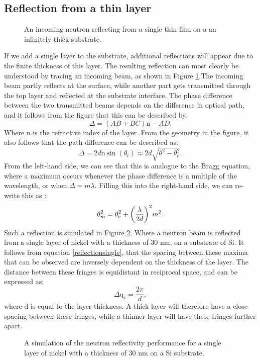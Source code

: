 \subsection{Reflection from a thin layer}
\begin{figure}[b]
	\centering
	\def\svgwidth{\textwidth}
	
	\caption{An incoming neutron reflecting from a single thin film on a an infinitely thick substrate.}
	\label{singlelayersketch}
\end{figure}
If we add a single layer to the substrate, additional reflections will appear due to the finite thickness of this layer. The resulting reflection can most clearly be understood by tracing an incoming beam, as shown in Figure \ref{singlelayersketch}.The incoming beam partly reflects at the surface, while another part gets transmitted through the top layer and reflected at the substrate interface. The phase difference between the two transmitted beams depends on the difference in optical path, and it follows from the figure that this can be described by:
\begin{equation}
	\Delta = (AB + BC) \textrm{n}  - AD.
\end{equation}
Where n is the refractive index of the layer. From the geometry in the figure, it also follows that the path difference can be described as:
\begin{equation}
	\Delta = 2d \textrm{n} \sin (\theta_t) \approx 2d \sqrt{\theta^2 - \theta_c^2}.
\end{equation}
From the left-hand side, we can see that this is analogue to the Bragg equation, where a maximum occurs whenever the phase difference is a multiple of the wavelength, or when $\Delta= m \lambda$. Filling this into the right-hand side, we can re-write this as \cite{birkholz}:
\begin{equation}\label{reflectionsingle}
	\theta_m^2 = \theta_c^2 + \qty(\frac{\lambda}{2d})^2m^2.
\end{equation}
Such a reflection is simulated in Figure \ref{simulated_singlelayer}. Where a neutron beam is reflected from a single layer of nickel with a thickness of 30 nm, on a substrate of Si. It follows from equation \ref{reflectionsingle}, that the spacing between these maxima that can be observed are inversely dependent on the thickness of the layer. The distance between these fringes is equidistant in reciprocal space, and can be expressed as:
\begin{equation}
	\Delta \textrm{q}_\textrm{z} = \frac{2\pi}{d},
\end{equation}
where d is equal to the layer thickness. A thick layer will therefore have a close spacing between these fringes, while a thinner layer will have these fringes further apart.
\begin{figure}
	\centering
	\def\svgwidth{\textwidth}
	
	\caption{A simulation of the neutron reflectivity performance for a single layer of nickel with a thickness of 30 nm on a Si substrate.}
	\label{simulated_singlelayer}
\end{figure}
\clearpage
